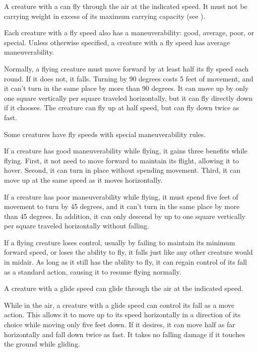         \label{Flying}
        A creature with a  can fly through the air at the indicated speed.
        It must not be carrying weight in excess of its maximum carrying capacity (see ).

        Each creature with a fly speed also has a maneuverability: good, average, poor, or special.
        Unless otherwise specified, a creature with a fly speed has average maneuverability.

        Normally, a flying creature must move forward by at least half its fly speed each round. If it does not, it falls.
        Turning by 90 degrees costs 5 feet of movement, and it can't turn in the same place by more than 90 degrees.
        It can move up by only one square vertically per square traveled horizontally, but it can fly directly down if it chooses.
        The creature can fly up at half speed, but can fly down twice as fast.

        \label{Maneuverability} Some creatures have fly speeds with special maneuverability rules.

         If a creature has good maneuverability while flying, it gains three benefits while flying.
        First, it not need to move forward to maintain its flight, allowing it to hover.
        Second, it can turn in place without spending movement.
        Third, it can move up at the same speed as it moves horizontally.

         If a creature has poor maneuverability while flying, it must spend five feet of movement to turn by 45 degrees, and it can't turn in the same place by more than 45 degrees. In addition, it can only descend by up to one square vertically per square traveled horizontally without falling.

         If a flying creature loses control, usually by failing to maintain its minimum forward speed, or loses the ability to fly, it falls just like any other creature would in midair. As long as it still has the ability to fly, it can regain control of its fall as a standard action, causing it to resume flying normally.

        \label{Gliding}
        A creature with a glide speed can glide through the air at the indicated speed.

        While in the air, a creature with a glide speed can control its fall as a move action. This allows it to move up to its speed horizontally in a direction of its choice while moving only five feet down. If it desires, it can move half as far horizontally and fall down twice as fast. It takes no falling damage if it touches the ground while gliding.

